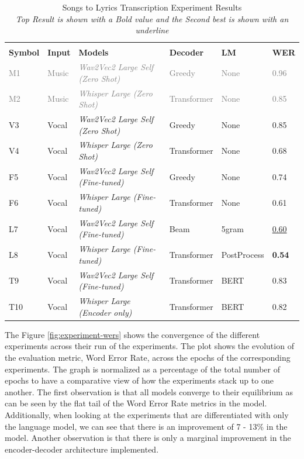\renewcommand{\arraystretch}{2}
\setlength{\arrayrulewidth}{0.3mm}
\begin{table}[H]
\small
\begin{center}
\begin{tabular}{ |p{1.5cm} | p{1cm} | p{6cm}| p{2cm}| p{2cm}| p{1cm}| }
\multicolumn{6}{c}{ } \\
\cline{1-6}
\textbf{Symbol} & \textbf{Input} & \textbf{Models}  & \textbf{Decoder} & \textbf{LM} & \textbf{WER}  \\
\hline  \hline
\textcolor{gray}{M1} & \textcolor{gray}{Music} & \textcolor{gray}{\textit{Wav2Vec2 Large Self (Zero Shot)}} & \textcolor{gray}{Greedy} & \textcolor{gray}{None} & \textcolor{gray}{0.96}  \\
\textcolor{gray}{M2} & \textcolor{gray}{Music}  & \textcolor{gray}{\textit{Whisper Large (Zero Shot)}} & \textcolor{gray}{Transformer} &  \textcolor{gray}{None} & \textcolor{gray}{0.85} \\
\hline
V3 & Vocal & \textit{Wav2Vec2 Large Self (Zero Shot)} & Greedy &  None & 0.85  \\
V4 & Vocal  & \textit{Whisper Large (Zero Shot)} & Transformer &  None & 0.68 \\
\hline
F5 & Vocal & \textit{Wav2Vec2 Large Self (Fine-tuned)} & Greedy &  None & 0.74  \\
F6 & Vocal  & \textit{Whisper Large (Fine-tuned)} & Transformer &  None & 0.61 \\
\hline
L7 & Vocal & \textit{Wav2Vec2 Large Self (Fine-tuned)} & Beam &  5gram & \underline{0.60}  \\
L8 & Vocal  & \textit{Whisper Large (Fine-tuned)} & Transformer &  PostProcess & \textbf{0.54} \\
\hline
T9 & Vocal & \textit{Wav2Vec2 Large Self (Fine-tuned)} & Transformer &  BERT & 0.83  \\
T10 & Vocal & \textit{Whisper Large (Encoder only)} & Transformer &  BERT & 0.82  \\

 \hline  \hline
\end{tabular} 
\caption{\label{consolidated-results-summary} Songs to Lyrics Transcription Experiment Results \\ \textit{Top Result is shown with a Bold value and the Second best is shown with an underline}}
\end{center}
\end{table}

The Figure \ref{fig:experiment-wers} shows the convergence of the different experiments across their run of the experiments. The plot shows the evolution of the evaluation metric, Word Error Rate, across the epochs of the corresponding experiments. The graph is normalized as a percentage of the total number of epochs to have a comparative view of how the experiments stack up to one another. The first observation is that all models converge to their equilibrium as can be seen by the flat tail of the Word Error Rate metrics in the model. Additionally, when looking at the experiments that are differentiated with only the language model, we can see that there is an improvement of 7 - 13\% in the model. Another observation is that there is only a marginal improvement in the encoder-decoder architecture implemented.

